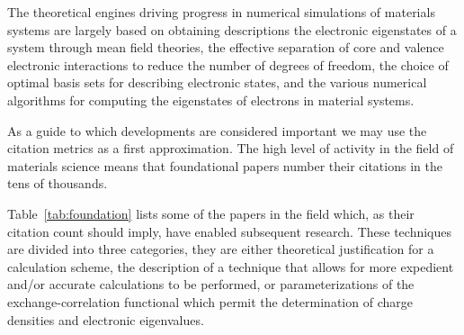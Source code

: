 The theoretical engines driving progress in numerical simulations of materials systems are
largely based on obtaining descriptions the electronic eigenstates 
of a system through mean field theories, the effective separation of core and 
valence electronic interactions to reduce the number of degrees of freedom, 
the choice of optimal basis sets for describing electronic states, 
and the various numerical algorithms for 
computing the eigenstates of electrons in material systems.

As a guide to which developments are considered important we may
use the citation metrics as a first approximation. The high level of 
activity in the field of materials science 
means that foundational papers number their citations in the tens of thousands. 

Table~\ref{tab:foundation} lists some of the papers in the field which, as
their citation count should imply, have enabled subsequent research. 
These techniques are divided into three categories, 
they are either theoretical justification for a calculation scheme, the description of
a technique that allows for more expedient and/or accurate calculations to be performed, 
or parameterizations of the exchange-correlation functional which permit the determination
of charge densities and electronic eigenvalues.

\begin{table}
\caption{Citations are relevant up to Nov. 2017. Citations are according 
to the journals in which they appear. 
The actual number of citations are much higher. 
\label{tab:theoreticalpapers}}
\end{table}

